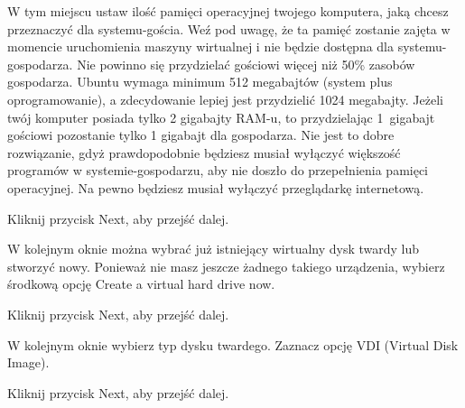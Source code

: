W tym miejscu ustaw ilość pamięci operacyjnej twojego komputera, jaką chcesz przeznaczyć dla systemu-gościa. Weź pod uwagę, że ta pamięć zostanie zajęta w momencie uruchomienia maszyny wirtualnej i nie będzie dostępna dla systemu-gospodarza. Nie powinno się przydzielać gościowi więcej niż 50\% zasobów gospodarza. Ubuntu wymaga minimum 512 megabajtów (system plus oprogramowanie), a zdecydowanie lepiej jest przydzielić 1024 megabajty. Jeżeli twój komputer posiada tylko 2 gigabajty RAM-u, to przydzielając 1~gigabajt gościowi pozostanie tylko 1 gigabajt dla gospodarza. Nie jest to dobre rozwiązanie, gdyż prawdopodobnie będziesz musiał wyłączyć większość programów w systemie-gospodarzu, aby nie doszło do przepełnienia pamięci operacyjnej. Na pewno będziesz musiał wyłączyć przeglądarkę internetową.

\begin{flushright}
Kliknij przycisk \textcolor{ubuntu_orange}{Next}, aby przejść dalej.
\end{flushright}

W kolejnym oknie można wybrać już istniejący wirtualny dysk twardy lub stworzyć nowy. Ponieważ nie masz jeszcze żadnego takiego urządzenia, wybierz środkową opcję \textcolor{ubuntu_orange}{Create a virtual hard drive now}.
\begin{flushright}
Kliknij przycisk \textcolor{ubuntu_orange}{Next}, aby przejść dalej.
\end{flushright}

W kolejnym oknie wybierz typ dysku twardego. Zaznacz opcję \textcolor{ubuntu_orange}{VDI (Virtual Disk Image)}.
\begin{flushright}
Kliknij przycisk \textcolor{ubuntu_orange}{Next}, aby przejść dalej.
\end{flushright}

